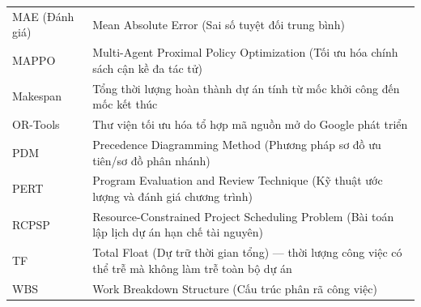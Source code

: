 \begin{longtable}{p{4.2cm} p{10.3cm}}
    MAE (Đánh giá) & Mean Absolute Error (Sai số tuyệt đối trung bình) \\
    MAPPO & Multi-Agent Proximal Policy Optimization (Tối ưu hóa chính sách cận kề đa tác tử) \\
    Makespan & Tổng thời lượng hoàn thành dự án tính từ mốc khởi công đến mốc kết thúc \\
    OR-Tools & Thư viện tối ưu hóa tổ hợp mã nguồn mở do Google phát triển \\
    PDM & Precedence Diagramming Method (Phương pháp sơ đồ ưu tiên/sơ đồ phân nhánh) \\
    PERT & Program Evaluation and Review Technique (Kỹ thuật ước lượng và đánh giá chương trình) \\
    RCPSP & Resource-Constrained Project Scheduling Problem (Bài toán lập lịch dự án hạn chế tài nguyên) \\
    TF & Total Float (Dự trữ thời gian tổng) --- thời lượng công việc có thể trễ mà không làm trễ toàn bộ dự án \\
    WBS & Work Breakdown Structure (Cấu trúc phân rã công việc) \\
    \bottomrule
\end{longtable}
